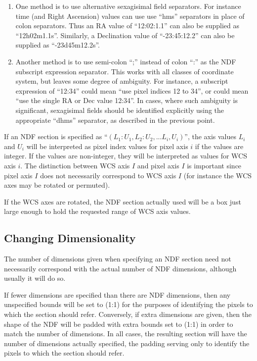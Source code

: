 \documentclass[twoside,11pt]{article}
\newcommand{\xlabel}[1]{}
\begin{document}
\begin{enumerate}
\item One method is to use alternative sexagisimal field separators. For
instance time (and Right Ascension) values can use use ``hms''
separators in place of colon separators. Thus an RA value of ``12:02:1.1'' 
can also be supplied as ``12h02m1.1s''. Similarly, a Declination value of 
``-23:45:12.2'' can also be supplied as ``-23d45m12.2s''.
\item Another method is to use semi-colon ``;'' instead of colon ``:'' as
the NDF subscript expression separator. This works with all classes of
coordinate system, but leaves some degree of ambiguity. For instance,
a subscript expression of ``12:34'' could mean ``use pixel indices 12 to
34'', or could mean ``use the single RA or Dec value 12:34''. In cases,
where such ambiguity is significant, sexagisimal fields should be
identified explicitly using the appropriate ``dhms'' separator, as
described in the previous point.
\end{enumerate}

If an NDF section is specified as ``$(L_{1}:U_{1},L_{2}:U_{2},  ...  L_{i},U_{i})$'', 
the axis values $L_{i}$ and $U_{i}$ will be interpreted as pixel index
values for pixel axis $i$ if the values are integer. If the values are
non-integer, they will be interpreted as values for WCS axis $i$. The
distinction between WCS axis $I$ and pixel axis $I$ is important since
pixel axis $I$ does not necessarily correspond to WCS axis $I$ (for
instance the WCS axes may be rotated or permuted).

If the WCS axes are rotated, the NDF section actually used will be a box
just large enough to hold the requested range of WCS axis values.


\subsection{\xlabel{changing_dimensionality}Changing Dimensionality}

The number of dimensions given when specifying an NDF section need not
necessarily correspond with the actual number of NDF dimensions, although
usually it will do so.

If fewer dimensions are specified than there are NDF dimensions, then any
unspecified bounds will be set to (1:1) for the purposes of identifying the
pixels to which the section should refer. Conversely, if extra dimensions are
given, then the shape of the NDF will be padded with extra bounds set
to (1:1) in order to match the number of dimensions. In all cases, the
resulting section will have the number of dimensions actually
specified, the padding serving only to identify the pixels to which
the section should refer.
\end{document}
